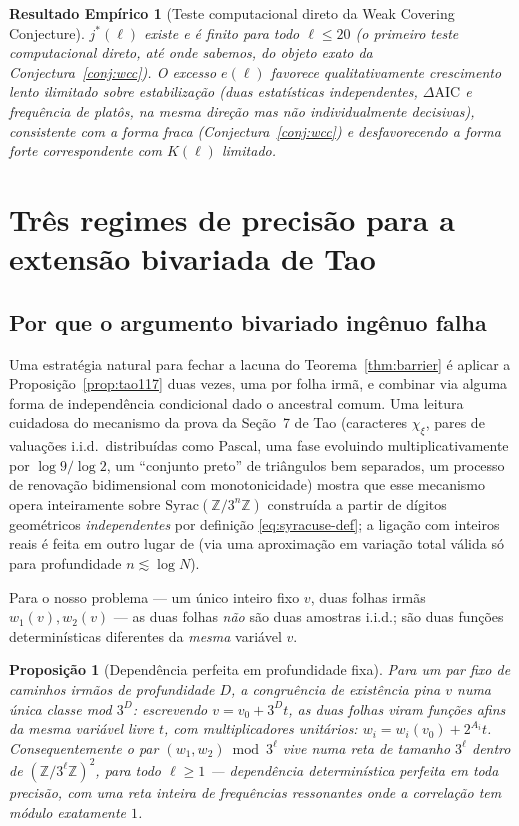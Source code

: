 \documentclass[11pt]{article}
\newtheorem{proposition}[theorem]{Proposição}
\newtheorem{empirical}[theorem]{Resultado Empírico}
\theoremstyle{definition}
\theoremstyle{remark}
\begin{document}
\begin{empirical}[Teste computacional direto da Weak Covering
Conjecture]\label{thm:wcc}
$j^\ast(\ell)$ existe e é finito para todo $\ell\le 20$ (o primeiro
teste computacional direto, até onde sabemos, do objeto exato da
Conjectura~\ref{conj:wcc}). O excesso $e(\ell)$ favorece
qualitativamente crescimento lento ilimitado sobre estabilização
(duas estatísticas independentes, $\Delta\mathrm{AIC}$ e frequência de
platôs, na mesma direção mas não individualmente decisivas),
consistente com a forma fraca (Conjectura~\ref{conj:wcc}) e
desfavorecendo a forma forte correspondente com $K(\ell)$ limitado.
\end{empirical}

\section{Três regimes de precisão para a extensão bivariada de Tao}
\label{sec:regimes}

\subsection{Por que o argumento bivariado ingênuo falha}

Uma estratégia natural para fechar a lacuna do Teorema~\ref{thm:barrier}
é aplicar a Proposição~\ref{prop:tao117} duas vezes, uma por folha
irmã, e combinar via alguma forma de independência condicional dado o
ancestral comum. Uma leitura cuidadosa do mecanismo da prova da
Seção~7 de Tao (caracteres $\chi_\xi$, pares de valuações i.i.d.\
distribuídas como Pascal, uma fase evoluindo multiplicativamente por
$\log 9/\log 2$, um ``conjunto preto'' de triângulos bem separados, um
processo de renovação bidimensional com monotonicidade) mostra que
esse mecanismo opera inteiramente sobre
$\mathrm{Syrac}(\mathbb{Z}/3^n\mathbb{Z})$ construída a partir de
dígitos geométricos \emph{independentes} por definição
\eqref{eq:syracuse-def}; a ligação com inteiros reais é feita em outro
lugar de \cite{Tao2022} (via uma aproximação em variação total válida
só para profundidade $n\lesssim\log N$).

Para o nosso problema --- um único inteiro fixo $v$, duas folhas irmãs
$w_1(v),w_2(v)$ --- as duas folhas \emph{não} são duas amostras
i.i.d.; são duas funções determinísticas diferentes da \emph{mesma}
variável $v$.

\begin{proposition}[Dependência perfeita em profundidade
fixa]\label{prop:fixed-pair}
Para um par fixo de caminhos irmãos de profundidade $D$, a congruência
de existência pina $v$ numa única classe mod $3^D$: escrevendo
$v=v_0+3^D t$, as duas folhas viram funções afins da mesma variável
livre $t$, com multiplicadores unitários: $w_i=w_i(v_0)+2^{A_i}t$.
Consequentemente o par $(w_1,w_2)\bmod 3^\ell$ vive numa reta de
tamanho $3^\ell$ dentro de $(\mathbb{Z}/3^\ell\mathbb{Z})^2$, para todo
$\ell\ge 1$ --- dependência determinística perfeita em toda precisão,
com uma reta inteira de frequências ressonantes onde a correlação tem
módulo exatamente $1$.
\end{proposition}
\end{document}
